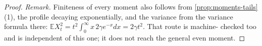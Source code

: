 \begin{proof}
\emph{Remark.} Finiteness of every moment also follows from \ref{prop:moments-tails}(1), the
profile decaying exponentially, and the variance from the variance formula there:
$\mathbb{E}X_t^2 = t^2\int_0^\infty x\,2\gamma e^{-x}dx = 2\gamma t^2$. That route is machine-
checked too and is independent of this one; it does not reach the general even moment.
\end{proof}

